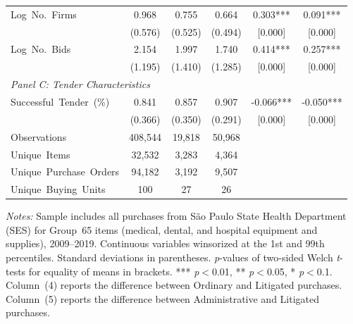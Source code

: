 \begin{table}[ht]
\begin{threeparttable}
\begin{tabular}{lccccc}
    Log~No.~Firms & 0.968 & 0.755 & 0.664 & 0.303*** & 0.091*** \\
    & (0.576) & (0.525) & (0.494) & [0.000] & [0.000] \\[3pt]
    Log~No.~Bids & 2.154 & 1.997 & 1.740 & 0.414*** & 0.257*** \\
    & (1.195) & (1.410) & (1.285) & [0.000] & [0.000] \\[3pt]
    \hline
    \multicolumn{6}{l}{\textit{Panel C: Tender Characteristics}} \\[3pt]
    Successful~Tender~(\%) & 0.841 & 0.857 & 0.907 & -0.066*** & -0.050*** \\
    & (0.366) & (0.350) & (0.291) & [0.000] & [0.000] \\[3pt]
    \hline
    Observations & 408,544 & 19,818 & 50,968 & & \\
    Unique~Items & 32,532 & 3,283 & 4,364 & & \\
    Unique~Purchase~Orders & 94,182 & 3,192 & 9,507 & & \\
    Unique~Buying~Units & 100 & 27 & 26 & & \\
    \hline\hline
  \end{tabular}
  \begin{tablenotes}
    \footnotesize
    \item \textit{Notes:} Sample includes all purchases from S\~ao Paulo State Health Department (SES) for Group~65 items (medical, dental, and hospital equipment and supplies), 2009--2019. Continuous variables winsorized at the 1st and 99th percentiles. Standard deviations in parentheses.
    \textit{p}-values of two-sided Welch \textit{t}-tests for equality of means in brackets.
    *** \textit{p}$<$0.01, ** \textit{p}$<$0.05, * \textit{p}$<$0.1.
    Column~(4) reports the difference between Ordinary and Litigated purchases.
    Column~(5) reports the difference between Administrative and Litigated purchases.
  \end{tablenotes}
  \end{threeparttable}
\end{table}
